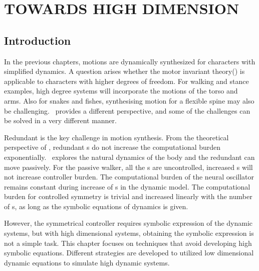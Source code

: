 \chapter{TOWARDS HIGH DIMENSION}
\label{chap:highdor}
\graphicspath{{HiDof/HiDofFigs/EPS/}{HiDof/HiDofFigs/}}
\section{Introduction}
In the previous chapters, motions are dynamically synthesized for characters with simplified dynamics.
A question arises whether the  motor invariant theory(\moit) is applicable to characters with higher degrees of freedom.
For walking and stance examples, high degree systems will incorporate the motions of the torso and arms.
Also for snakes and fishes, synthesising motion for a flexible spine may also be  challenging.
\moit\ provides a different perspective, and some of the challenges can be solved in a very different manner.



Redundant {\dof} is the key challenge in motion synthesis.
From the theoretical perspective of \moit, redundant {\dof}s do not increase the computational burden exponentially.
\moit\  explores the natural dynamics of the body and the redundant {\dof} can move passively.
For the passive walker, all the \dof s are uncontrolled, increased {\dof}s will not increase controller burden.
The computational burden of the neural oscillator remains constant during increase of {\dof}s in the dynamic model.
The computational burden for controlled symmetry is trivial and increased linearly with the number of {\dof}s, as long as the symbolic equations of dynamics is given.


However, the symmetrical controller requires symbolic expression of the dynamic systems, but with high dimensional systems, obtaining the symbolic expression is not a simple task. 
This chapter focuses on techniques that avoid developing high {\dof} symbolic equations. Different strategies are developed to utilized low dimensional dynamic equations to simulate high dynamic systems.




